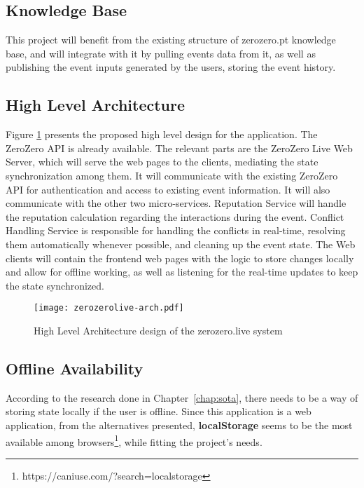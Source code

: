 \subsection{Knowledge Base}
This project will benefit from the existing structure of zerozero.pt knowledge base, and will integrate with it by pulling events data from it, as well as publishing the event inputs generated by the users, storing the event history.

\subsection{High Level Architecture}

Figure \ref{fig:high-level-arch} presents the proposed high level design for the application. The ZeroZero API is already available. The relevant parts are the ZeroZero Live Web Server, which will serve the web pages to the clients, mediating the state synchronization among them. It will communicate with the existing ZeroZero API for authentication and access to existing event information. It will also communicate with the other two micro-services. Reputation Service will handle the reputation calculation regarding the interactions during the event. Conflict Handling Service is responsible for handling the conflicts in real-time, resolving them automatically whenever possible, and cleaning up the event state. The Web clients will contain the frontend web pages with the logic to store changes locally and allow for offline working, as well as listening for the real-time updates to keep the state synchronized.

\begin{figure}[t]
    \begin{center}
        \leavevmode
        \texttt{[image: zerozerolive-arch.pdf]}
        \caption{High Level Architecture design of the zerozero.live system}
        \label{fig:high-level-arch}
    \end{center}
\end{figure}

\subsection{Offline Availability} \label{sec:prob-solution-offline-avail}
According to the research done in Chapter~\ref{chap:sota}, there needs to be a way of storing state locally if the user is offline. Since this application is a web application, from the alternatives presented, \textbf{localStorage} seems to be the most available among browsers\footnote{https://caniuse.com/?search=localstorage}, while fitting the project's needs. 

